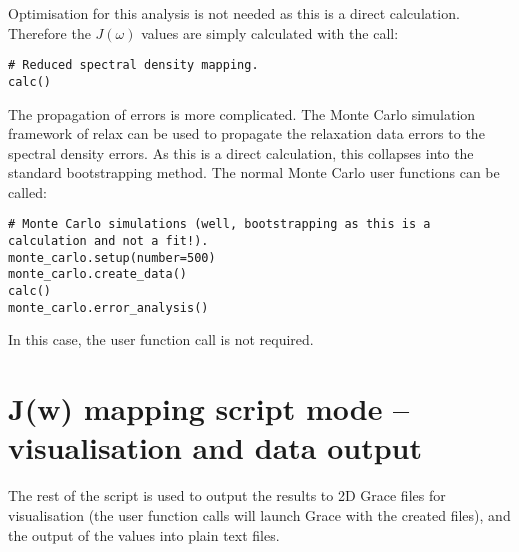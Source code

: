 Optimisation for this analysis is not needed as this is a direct calculation.
Therefore the $J(\omega)$ values are simply calculated with the call:

\begin{lstlisting}[firstnumber=31]
# Reduced spectral density mapping.
calc()
\end{lstlisting}

The propagation of errors is more complicated.
The Monte Carlo simulation framework of relax can be used to propagate the relaxation data errors to the spectral density errors.
As this is a direct calculation, this collapses into the standard bootstrapping method.
The normal Monte Carlo user functions can be called:

\begin{lstlisting}[firstnumber=34]
# Monte Carlo simulations (well, bootstrapping as this is a calculation and not a fit!).
monte_carlo.setup(number=500)
monte_carlo.create_data()
calc()
monte_carlo.error_analysis()
\end{lstlisting}

In this case, the  user function call is not required.



\section{J(w) mapping script mode -- visualisation and data output}

The rest of the script is used to output the results to 2D Grace files for visualisation (the  user function calls will launch Grace with the created files), and the output of the values into plain text files.
